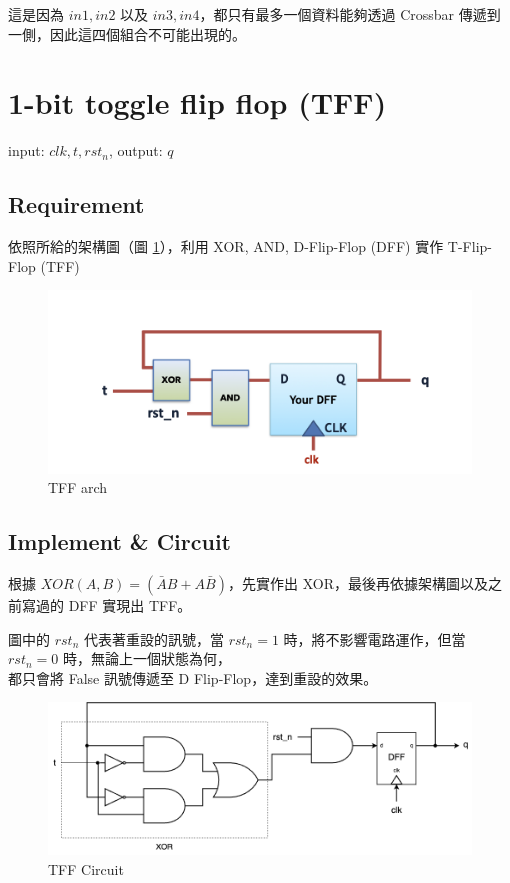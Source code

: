 \documentclass[10.5pt,compsoc,UTF8]{CjC}
\theoremstyle{mystyle}
\begin{document}
這是因為 $in1, in2$ 以及 $in3, in4$，都只有最多一個資料能夠透過 Crossbar 傳遞到一側，因此這四個組合不可能出現的。


\section{1-bit toggle flip flop (TFF)}
input: $clk, t, rst_n$, output: $q$

\subsection{Requirement}
依照所給的架構圖（圖 \ref{fig:TFF_spec}），利用 XOR, AND, D-Flip-Flop (DFF) 實作 T-Flip-Flop (TFF)

\begin{figure}[h]
    \centering
    \includegraphics[width=\textwidth]{TFF_spec.png}
      \caption{TFF arch}
    \label{fig:TFF_spec}
\end{figure}

\subsection{Implement \& Circuit}

根據 $XOR(A, B) = (\bar{A}B + A\bar{B})$，先實作出 XOR，最後再依據架構圖以及之前寫過的 DFF 實現出 TFF。
\par
圖中的 $rst_n$ 代表著重設的訊號，當 $rst_n = 1$ 時，將不影響電路運作，但當 $rst_n = 0$ 時，無論上一個狀態為何，\\
都只會將 False 訊號傳遞至 D Flip-Flop，達到重設的效果。

\begin{figure}
    \centering
    \includegraphics[width=\textwidth]{Toggle-D_Flip_Flop.png}
      \caption{TFF Circuit}
    \label{fig:TFF}
\end{figure}
\end{document}

